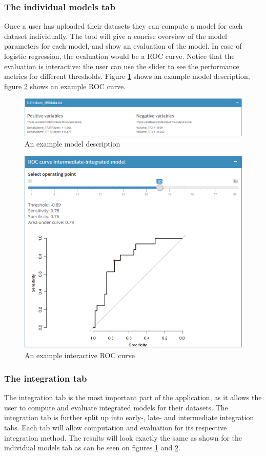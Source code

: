 \subsubsection{The individual models tab}
Once a user has uploaded their datasets they can compute a model for each dataset individually. The tool will give a concise overview of the model parameters for each model, and show an evaluation of the model. In case of logistic regression, the evaluation would be a ROC curve. Notice that the evaluation is interactive: the user can use the slider to see the performance metrics for different thresholds. Figure \ref{fig:tool-model} shows an example model description, figure \ref{fig:tool-roc} shows an example ROC curve.
\begin{figure}
	\centering
	\includegraphics[scale=.4]{images/tool_model_mri}
	\caption{An example model description}
	\label{fig:tool-model}
\end{figure}
\begin{figure}
	\centering
	\includegraphics[scale=.65]{images/tool_auc}
	\caption{An example interactive ROC curve}
	\label{fig:tool-roc}
\end{figure}
\subsubsection{The integration tab}
The integration tab is the most important part of the application, as it allows the user to compute and evaluate integrated models for their datasets. The integration tab is further split up into early-, late- and intermediate integration tabs. Each tab will allow computation and evaluation for its respective integration method. The results will look exactly the same as shown for the individual models tab as can be seen on figures \ref{fig:tool-model} and \ref{fig:tool-roc}.


